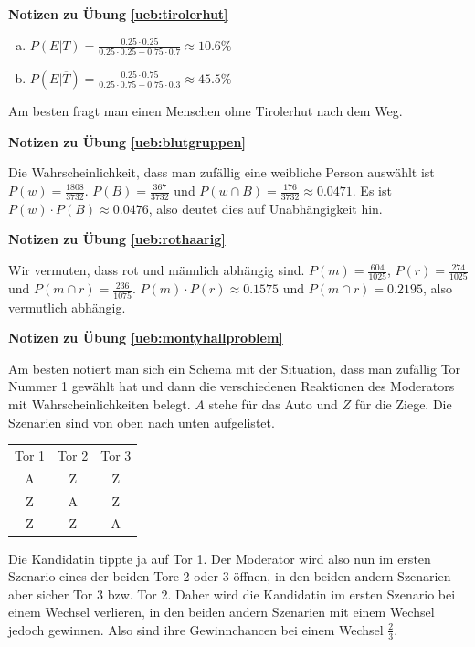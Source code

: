 \documentclass[%
<<<<<<< Updated upstream
11pt,%
twoside,%
titlepage,%
german,%
=======
11pt,%
twoside,%
titlepage,%
swissgerman,%
>>>>>>> Stashed changes
headsepline%
]{scrartcl}
\newcommand{\faReturnGray}{\textcolor{gray}{\faMailReply}} %
\newcommand{\spaltenheight}{\rule{0mm}{3ex}}
\newcommand{\spaltensep}{\\[1ex]}
\theoremstyle{definition}
\theoremstyle{plain}
\newcommand{\concatueb}[1]{ueb:#1}%
\newcommand{\concatlsg}[1]{lsg:#1}%
\newenvironment{lsg}[1]{%
    \par\noindent\textbf{Notizen zu Übung \ref{\concatueb{#1}}}\label{\concatlsg{#1}}
    \hfill\hyperref[\concatueb{#1}]{\faReturnGray}\par %
}{%
    \par%
}
\newcommand{\concatueb}[1]{ueb:#1}%
\newcommand{\concatlsg}[1]{lsg:#1}%
\newenvironment{lsg}[1]{%
    \par\noindent\textbf{Notizen zu Übung \ref{\concatueb{#1}}.}%
    \label{\concatlsg{#1}}
}{%
    \par%
}
\begin{document}
\begin{lsg}{tirolerhut}
    \begin{enumerate}[a)]
        \item $P(E|T)=\frac{0.25\cdot0.25}{0.25\cdot0.25+0.75\cdot0.7}\approx10.6\%$
        \item $P(E|\overline{T})=\frac{0.25\cdot0.75}{0.25\cdot0.75+0.75\cdot0.3}\approx45.5\%$
    \end{enumerate}
    Am besten fragt man einen Menschen ohne Tirolerhut nach dem Weg.
\end{lsg}
\begin{lsg}{blutgruppen}
    Die Wahrscheinlichkeit, dass man zufällig eine weibliche Person auswählt ist $P(w)=\frac{1808}{3732}$. $P(B)=\frac{367}{3732}$ und $P(w\cap B)=\frac{176}{3732}\approx0.0471$. Es ist $P(w)\cdot P(B)\approx0.0476$, also deutet dies auf Unabhängigkeit hin.
\end{lsg}
\begin{lsg}{rothaarig}
    Wir vermuten, dass rot und männlich abhängig sind. $P(m)=\frac{604}{1025}$, $P(r)=\frac{274}{1025}$ und $P(m\cap r)=\frac{236}{1075}$. $P(m)\cdot P(r)\approx0.1575$ und $P(m\cap r)=0.2195$, also vermutlich abhängig.
\end{lsg}
\begin{lsg}{montyhallproblem}
 Am besten notiert man sich ein Schema mit der Situation, dass man zufällig Tor Nummer 1 gewählt hat und dann die verschiedenen Reaktionen des Moderators mit Wahrscheinlichkeiten belegt. $A$ stehe für das Auto und $Z$ für die Ziege. Die Szenarien sind von oben nach unten aufgelistet.

\begin{table}[h!]
\begin{center}
\begin{tabular}{|c|c|c|}
\hline
\rowcolor{Gray}\spaltenheight Tor 1 & Tor 2 & Tor 3 \spaltensep \hhline{|-|-|-|}
\rowcolor{lightyellow}\spaltenheight  A & Z & Z \spaltensep \hhline{|-|-|-|}
\rowcolor{Gray}\spaltenheight Z & A & Z \spaltensep \hhline{|-|-|-|}
\rowcolor{lightyellow}\spaltenheight  Z & Z & A \spaltensep \hline
\end{tabular}
\end{center}
\end{table}
Die Kandidatin tippte ja auf Tor 1. Der Moderator wird also nun im ersten Szenario eines der beiden Tore 2 oder 3 öffnen, in den beiden andern Szenarien aber sicher Tor 3 bzw. Tor 2. Daher wird die Kandidatin im ersten Szenario bei einem Wechsel verlieren, in den beiden andern Szenarien mit einem Wechsel jedoch gewinnen. Also sind ihre Gewinnchancen bei einem Wechsel $\frac{2}{3}$.
\end{lsg}
\end{document}

